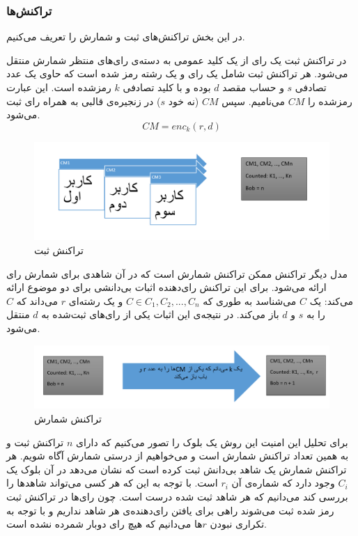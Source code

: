 \subsubsection{تراکنش‌ها}
در این بخش تراکنش‌های ثبت و شمارش را تعریف می‌کنیم.
\par
در تراکنش ثبت یک رای از یک کلید عمومی به دسته‌ی رای‌های منتظر شمارش منتقل می‌شود. هر تراکنش ثبت شامل یک رای و یک رشته 
رمز شده است که حاوی یک عدد تصادفی $s$ و حساب مقصد $d$ بوده و با کلید تصادفی $k$ رمزشده است. این عبارت رمز‌شده را $CM$ می‌نامیم. سپس $CM$ (نه خود $s$) در زنجیره‌ی قالبی به همراه رای ثبت می‌شود.
\\
\begin{equation}
CM = enc_{k} (r, d)
\label{eq:enc}
\end{equation}

\begin{figure}[h!]
	\centering
	\includegraphics[width=1\linewidth]{commit.PNG}
	\caption {تراکنش ثبت}
	\label{fig:commit}
\end{figure}

\par
مدل دیگر تراکنش ممکن تراکنش شمارش است که در آن شاهدی برای شمارش رای ارائه می‌شود. برای این تراکنش رای‌دهنده اثبات بی‌دانشی برای دو موضوع ارائه می‌کند: یک $C$ می‌شناسد به طوری که  $C \in C_1, C_2, ... ,C_n$ و یک رشته‌ای $r$ می‌داند که $C$ را به $s$ و $d$ باز می‌کند. در نتیجه‌ی این اثبات یکی از رای‌های ثبت‌شده به $d$ منتقل می‌شود. 

\begin{figure}[t]
	\centering
	\includegraphics[width=1\linewidth]{Count.PNG}
	\caption {تراکنش شمارش}
	\label{fig:count}
	\end{figure}
\par
برای تحلیل این امنیت این روش یک بلوک را تصور می‌کنیم که دارای $n$ تراکنش ثبت و به همین تعداد تراکنش شمارش است و می‌خواهیم از درستی شمارش آگاه شویم. هر تراکنش شمارش یک شاهد بی‌دانش ثبت کرده است که نشان می‌دهد در آن بلوک یک $C_i$ وجود دارد که شماره‌ی آن $r_i$ است. با توجه به این که هر کسی می‌تواند شاهد‌ها را بررسی کند می‌دانیم که هر شاهد ثبت شده درست است. چون رای‌‌ها در تراکنش ثبت رمز شده ثبت می‌شوند راهی برای یافتن رای‌دهنده‌ی هر شاهد نداریم و با توجه به تکراری نبودن $r$ها می‌دانیم که هیچ رای دوبار شمرده نشده است. 

